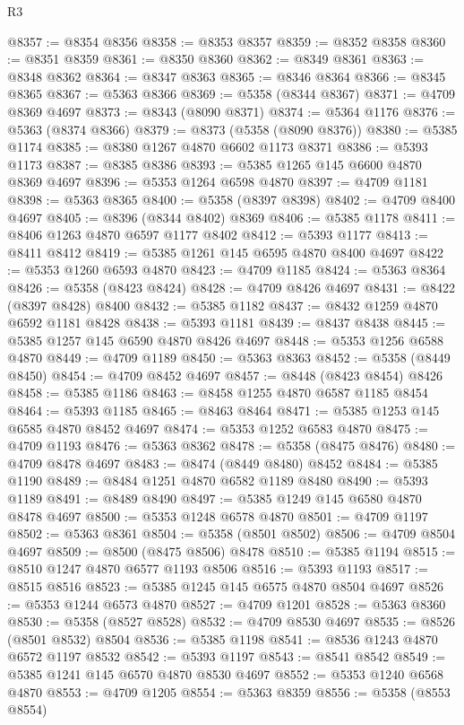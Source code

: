 \begin{lexlean}{R3}
\begin{coremodule}
@8357 := @8354 @8356
@8358 := @8353 @8357
@8359 := @8352 @8358
@8360 := @8351 @8359
@8361 := @8350 @8360
@8362 := @8349 @8361
@8363 := @8348 @8362
@8364 := @8347 @8363
@8365 := @8346 @8364
@8366 := @8345 @8365
@8367 := @5363 @8366
@8369 := @5358 (@8344 @8367)
@8371 := @4709 @8369 @4697
@8373 := @8343 (@8090 @8371)
@8374 := @5364 @1176
@8376 := @5363 (@8374 @8366)
@8379 := @8373 (@5358 (@8090 @8376))
@8380 := @5385 @1174
@8385 := @8380 @1267 @4870 @6602 @1173 @8371
@8386 := @5393 @1173
@8387 := @8385 @8386
@8393 := @5385 @1265 @145 @6600 @4870 @8369 @4697
@8396 := @5353 @1264 @6598 @4870
@8397 := @4709 @1181
@8398 := @5363 @8365
@8400 := @5358 (@8397 @8398)
@8402 := @4709 @8400 @4697
@8405 := @8396 (@8344 @8402) @8369
@8406 := @5385 @1178
@8411 := @8406 @1263 @4870 @6597 @1177 @8402
@8412 := @5393 @1177
@8413 := @8411 @8412
@8419 := @5385 @1261 @145 @6595 @4870 @8400 @4697
@8422 := @5353 @1260 @6593 @4870
@8423 := @4709 @1185
@8424 := @5363 @8364
@8426 := @5358 (@8423 @8424)
@8428 := @4709 @8426 @4697
@8431 := @8422 (@8397 @8428) @8400
@8432 := @5385 @1182
@8437 := @8432 @1259 @4870 @6592 @1181 @8428
@8438 := @5393 @1181
@8439 := @8437 @8438
@8445 := @5385 @1257 @145 @6590 @4870 @8426 @4697
@8448 := @5353 @1256 @6588 @4870
@8449 := @4709 @1189
@8450 := @5363 @8363
@8452 := @5358 (@8449 @8450)
@8454 := @4709 @8452 @4697
@8457 := @8448 (@8423 @8454) @8426
@8458 := @5385 @1186
@8463 := @8458 @1255 @4870 @6587 @1185 @8454
@8464 := @5393 @1185
@8465 := @8463 @8464
@8471 := @5385 @1253 @145 @6585 @4870 @8452 @4697
@8474 := @5353 @1252 @6583 @4870
@8475 := @4709 @1193
@8476 := @5363 @8362
@8478 := @5358 (@8475 @8476)
@8480 := @4709 @8478 @4697
@8483 := @8474 (@8449 @8480) @8452
@8484 := @5385 @1190
@8489 := @8484 @1251 @4870 @6582 @1189 @8480
@8490 := @5393 @1189
@8491 := @8489 @8490
@8497 := @5385 @1249 @145 @6580 @4870 @8478 @4697
@8500 := @5353 @1248 @6578 @4870
@8501 := @4709 @1197
@8502 := @5363 @8361
@8504 := @5358 (@8501 @8502)
@8506 := @4709 @8504 @4697
@8509 := @8500 (@8475 @8506) @8478
@8510 := @5385 @1194
@8515 := @8510 @1247 @4870 @6577 @1193 @8506
@8516 := @5393 @1193
@8517 := @8515 @8516
@8523 := @5385 @1245 @145 @6575 @4870 @8504 @4697
@8526 := @5353 @1244 @6573 @4870
@8527 := @4709 @1201
@8528 := @5363 @8360
@8530 := @5358 (@8527 @8528)
@8532 := @4709 @8530 @4697
@8535 := @8526 (@8501 @8532) @8504
@8536 := @5385 @1198
@8541 := @8536 @1243 @4870 @6572 @1197 @8532
@8542 := @5393 @1197
@8543 := @8541 @8542
@8549 := @5385 @1241 @145 @6570 @4870 @8530 @4697
@8552 := @5353 @1240 @6568 @4870
@8553 := @4709 @1205
@8554 := @5363 @8359
@8556 := @5358 (@8553 @8554)

\end{coremodule}
\end{lexlean}
